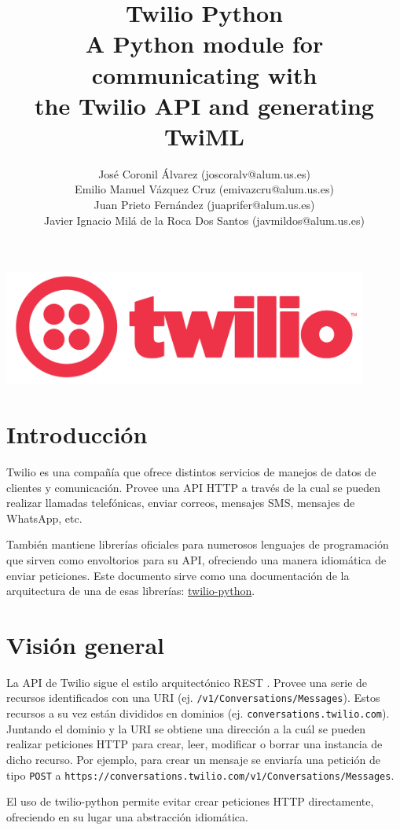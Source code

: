 \documentclass{article}
\title{%
  Twilio Python \\
  \large A Python module for communicating with \\
  the Twilio API and generating TwiML}
\author{José Coronil Álvarez (joscoralv@alum.us.es) \\
Emilio Manuel Vázquez Cruz (emivazcru@alum.us.es) \\
Juan Prieto Fernández (juaprifer@alum.us.es) \\
Javier Ignacio Milá de la Roca Dos Santos (javmildos@alum.us.es) \\}
\date{}
\begin{document}
\begin{titlepage}
  \centering
  \vfil
  {\bfseries\Large
      \thetitle
  }    
  \vfill
  \includegraphics[width=12cm]{logo.png} %
  \vfill
  \theauthor
\end{titlepage}

\tableofcontents
\newpage

\section{Introducción}

Twilio es una compañía que ofrece distintos servicios
de manejos de datos de clientes y comunicación.
Provee una API HTTP a través de la cual se pueden realizar llamadas telefónicas,
enviar correos, mensajes SMS, mensajes de WhatsApp, etc.

También mantiene librerías oficiales para numerosos lenguajes de programación
que sirven como envoltorios para su API,
ofreciendo una manera idiomática de enviar peticiones.
Este documento sirve como una documentación de la arquitectura
de una de esas librerías:
\href{https://github.com/twilio/twilio-python}{twilio-python}.

\section{Visión general}

La API de Twilio sigue el estilo arquitectónico REST \cite{twilio-rest}.
Provee una serie de recursos identificados con una URI
(ej. \verb|/v1/Conversations/Messages|).
Estos recursos a su vez están divididos en dominios
(ej. \verb|conversations.twilio.com|).
Juntando el dominio y la URI se obtiene una dirección
a la cuál se pueden realizar peticiones HTTP
para crear, leer, modificar o borrar una instancia de dicho recurso.
Por ejemplo, para crear un mensaje se enviaría una petición
de tipo \verb|POST|
a \verb|https://conversations.twilio.com/v1/Conversations/Messages|.

El uso de twilio-python permite evitar crear peticiones HTTP directamente,
ofreciendo en su lugar una abstracción idiomática.
\end{document}
